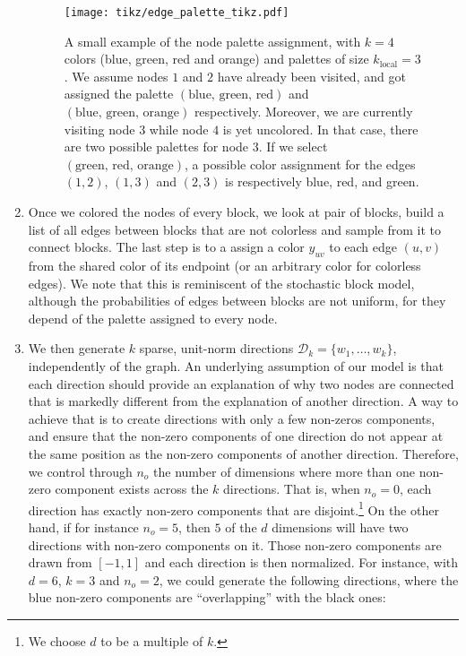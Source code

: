 \begin{enumerate}[1),leftmargin=*]
\begin{figure}[ht]
  \texttt{[image: tikz/edge\_palette\_tikz.pdf]}
  \caption[Finding the $k_\mathrm{local}$ directions of node when generating synthetic graph]{A
    small example of the node palette assignment, with $k=4$ colors (blue, green, red and
    orange) and palettes of size $k_\mathrm{local}=3$. We assume nodes $1$ and $2$ have already been
    visited, and got assigned the palette $(\text{blue, green, red})$ and $(\text{blue, green,
    orange})$ respectively. Moreover, we are currently visiting node $3$ while node $4$ is yet uncolored. In that
    case, there are two possible palettes for node $3$. If we select $(\text{green, red, orange})$, a
    possible color assignment for the edges $(1,2)$, $(1, 3)$ and $(2, 3)$ is respectively blue,
    red, and green.
  \label{fig:edge_palette}}
\end{figure}

\item
Once we colored the nodes of every block, we look at pair
of blocks, build a list of all edges between blocks that are not colorless and sample from it to
connect blocks. The last step is to a assign a color $y_{uv}$ to each edge $(u,v)$ from the shared color of its
endpoint (or an arbitrary color for colorless edges). We note that this is reminiscent of the stochastic
block model, although the probabilities of edges between blocks are not uniform, for they depend of
the palette assigned to every node.

  \item 
We then generate $k$ sparse, unit-norm directions $\mathcal{D}_k=\{w_1, \ldots, w_k\}$,
independently of the graph. An underlying assumption of our model is that each direction should
provide an explanation of why two nodes are connected that is markedly different from the
explanation of another direction. A way to achieve that is to create directions with only a few
non-zeros components, and ensure that the non-zero components of one direction do not appear at the
same position as the non-zero components of another direction. Therefore, we control through $n_o$
the number of dimensions where more than one non-zero component exists across the $k$ directions.
That is, when $n_o = 0$, each direction has exactly  non-zero components that are
disjoint.\footnote{We choose $d$ to be a multiple of $k$.} On the other hand, if for instance $n_o=5$,
then $5$ of the $d$ dimensions will have two directions with non-zero components on it. Those
non-zero components are drawn \uar{} from $[-1, 1]$ and each direction is then normalized. For
instance, with $d=6$, $k=3$ and $n_o=2$, we could generate the following directions, where the blue
non-zero components are \enquote{overlapping} with the black ones:


\end{enumerate}
